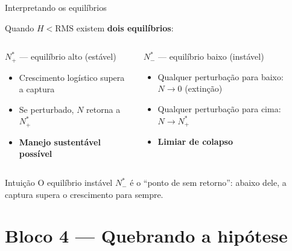 \documentclass[12pt]{beamer}
\begin{document}
\begin{frame}{Interpretando os equilíbrios}

  Quando $H < \text{RMS}$ existem \textbf{dois equilíbrios}:

  \bigskip
  \begin{columns}[T]
      \begin{exampleblock}{$N^*_+$ --- equilíbrio alto (estável)}
        \begin{itemize}
          \item Crescimento logístico supera a captura
          \item Se perturbado, $N$ retorna a $N^*_+$
          \item \textbf{Manejo sustentável possível}
        \end{itemize}
      \end{exampleblock}
      \begin{alertblock}{$N^*_-$ --- equilíbrio baixo (instável)}
        \begin{itemize}
          \item Qualquer perturbação para baixo:
            $N \to 0$ (extinção)
          \item Qualquer perturbação para cima:
            $N \to N^*_+$
          \item \textbf{Limiar de colapso}
        \end{itemize}
      \end{alertblock}
  \end{columns}

  \bigskip
  \begin{block}{Intuição}
    O equilíbrio instável $N^*_-$ é o ``ponto de sem retorno'':
    abaixo dele, a captura supera o crescimento para sempre.
  \end{block}

\end{frame}

\section{Bloco 4 — Quebrando a hipótese}
\end{document}
